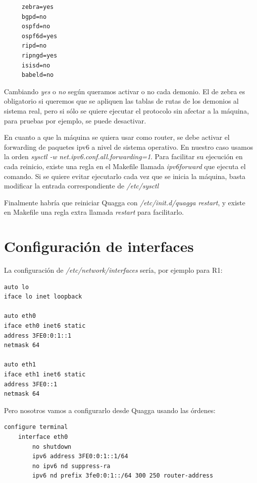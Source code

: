 \documentclass{article}
\begin{document}
 \begin{verbatim}
	 zebra=yes
	 bgpd=no
	 ospfd=no
	 ospf6d=yes
	 ripd=no
	 ripngd=yes
	 isisd=no
	 babeld=no
 \end{verbatim}

 Cambiando \textit{yes} o \textit{no} según queramos activar o no cada demonio. El de zebra es obligatorio si queremos que se apliquen las tablas de rutas de los demonios al sistema real, pero si sólo se quiere ejecutar el protocolo sin afectar a la máquina, para pruebas por ejemplo, se puede desactivar.

 En cuanto a que la máquina se quiera usar como router, se debe activar el forwarding de paquetes ipv6 a nivel de sistema operativo. En nuestro caso usamos la orden \textit{sysctl -w net.ipv6.conf.all.forwarding=1}. Para facilitar su ejecución en cada reinicio, existe una regla en el Makefile llamada \textit{ipv6forward} que ejecuta el comando. Si se quiere evitar ejecutarlo cada vez que se inicia la máquina, basta modificar la entrada correspondiente de \textit{/etc/sysctl}


 Finalmente habría que reiniciar Quagga con \textit{/etc/init.d/quagga restart}, y existe en Makefile una regla extra llamada \textit{restart} para facilitarlo.
 
\section{Configuración de interfaces}

La configuración de \textit{/etc/network/interfaces} sería, por ejemplo para R1:

\begin{BVerbatim}
auto lo
iface lo inet loopback

auto eth0
iface eth0 inet6 static
address 3FE0:0:1::1
netmask 64

auto eth1
iface eth1 inet6 static
address 3FE0::1
netmask 64
\end{BVerbatim}

\hfill


Pero nosotros vamos a configurarlo desde Quagga usando las órdenes:

\hfil

\begin{BVerbatim}
configure terminal
	interface eth0
		no shutdown
		ipv6 address 3FE0:0:1::1/64
		no ipv6 nd suppress-ra
		ipv6 nd prefix 3fe0:0:1::/64 300 250 router-address
\end{BVerbatim}

\hfil
\end{document}
